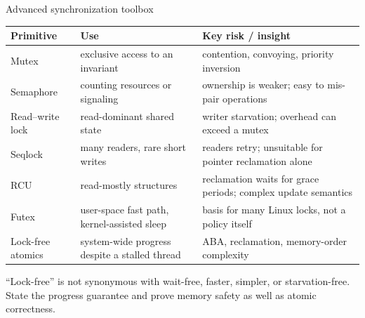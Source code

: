 \documentclass[aspectratio=169,11pt]{beamer}
\begin{document}
\begin{frame}{Advanced synchronization toolbox}
  \scriptsize
  \begin{tabularx}{\textwidth}{@{}lXX@{}}
    \toprule
    \textbf{Primitive} & \textbf{Use} & \textbf{Key risk / insight} \\
    \midrule
    Mutex & exclusive access to an invariant & contention, convoying, priority inversion \\
    Semaphore & counting resources or signaling & ownership is weaker; easy to mis-pair operations \\
    Read--write lock & read-dominant shared state & writer starvation; overhead can exceed a mutex \\
    Seqlock & many readers, rare short writes & readers retry; unsuitable for pointer reclamation alone \\
    RCU & read-mostly structures & reclamation waits for grace periods; complex update semantics \\
    Futex & user-space fast path, kernel-assisted sleep & basis for many Linux locks, not a policy itself \\
    Lock-free atomics & system-wide progress despite a stalled thread & ABA, reclamation, memory-order complexity \\
    \bottomrule
  \end{tabularx}
  \begin{tcolorbox}[title=Engineering principle]
    ``Lock-free'' is not synonymous with wait-free, faster, simpler, or starvation-free. State the progress guarantee and prove memory safety as well as atomic correctness.
  \end{tcolorbox}
\end{frame}
\end{document}
